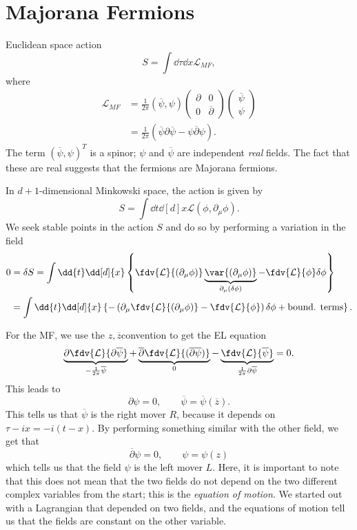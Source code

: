 \documentclass[twoside,symmetric, openany, 12pt]{./tuftebook}
\theoremstyle{definition}
\theoremstyle{definition}
\theoremstyle{definition}
\begin{document}
\section{Majorana Fermions}
Euclidean space action
\[
	S = \int \dd{\tau}\dd{x} \mathcal{L}_{MF},
\] 
where
\begin{align*}
	\mathcal{L}_{MF} &= \frac{1}{2\pi}(\overline{\psi}, \psi)\begin{pmatrix} \partial & 0 \\ 0 & \overline{\partial} \end{pmatrix} \begin{pmatrix} \overline{\psi} \\ \psi \end{pmatrix} \\
			 &= \frac{1}{2\pi}(\overline{\psi}\partial \overline{\psi}- \psi \overline{\partial}\psi)
.\end{align*} 
The term $(\overline{\psi}, \psi)^T$ is a spinor; $\psi$ and $\overline{\psi}$ are independent \emph{real} fields. The fact that these are real suggests that the fermions are Majorana fermions.
\begin{tcolorbox}[title=Euler-Lagrange Equations]
	In $d+1$-dimensional Minkowski space, the action is given by
	\[
		S = \int\dd{t}\dd[d]{x} \mathcal{L}(\phi, \partial_\mu \phi)
	.\] 
	We seek stable points in the action $S$ and do so by performing a variation in the field
	\begin{align*}
		0 &= \delta S = \int \dd{t} \dd[d]{x} \left\{ \fdv{\mathcal{L}}{(\partial_\mu \phi)} \underbrace{\var{(\partial_\mu\phi)}}_{\partial_\mu(\delta\phi)} - \fdv{\mathcal{L}}{\phi}\delta \phi \right\} \\
		  &= \int \dd{t} \dd[d]{x} \left\{ -\left( \partial_\mu \fdv{\mathcal{L}}{(\partial_\mu\phi)} -\fdv{\mathcal{L}}{\phi} \right) \delta\phi + \text{bound. terms} \right\} 
.\end{align*} 
\end{tcolorbox}
For the MF, we use the $z,\overline{z}$convention to get the EL equation
\[
	\underbrace{\partial \fdv{\mathcal{L}}{\partial \overline{\psi}}}_{-\frac{1}{2\pi}\overline{\psi}} + \underbrace{\overline{\partial}\fdv{\mathcal{L}}{(\overline{\partial}\overline{\psi})}}_0 - \underbrace{\fdv{\mathcal{L}}{\overline{\psi}}}_{\frac{1}{2\pi}\partial \overline{\psi}} = 0
.\] 
This leads to
\[
\partial \psi = 0, \qquad \overline{\psi}= \overline{\psi}(\overline{z})
.\] 
This tells us that $\overline{\psi}$ is the right mover $R$, because it depends on $\tau - ix = -i(t-x)$. By performing something similar with the other field, we get that
\[
	\overline{\partial}\psi = 0,\qquad \psi = \psi(z)
\]
which tells us that the field $\psi$ is the left mover $L$. Here, it is important to note that this does not mean that the two fields do not depend on the two different complex variables from the start; this is the \emph{equation of motion}. We started out with a Lagrangian that depended on two fields, and the equations of motion tell us that the fields are constant on the other variable.
\end{document}

